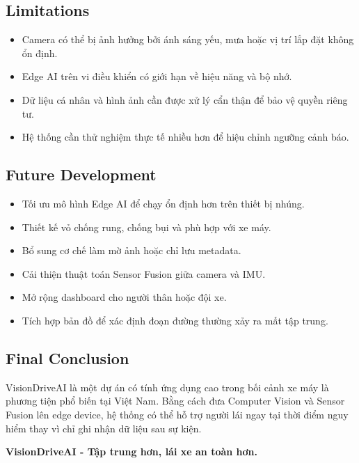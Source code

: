 \documentclass[12pt,a4paper]{article}
\begin{document}
\subsection{Limitations}

\begin{itemize}
    \item Camera có thể bị ảnh hưởng bởi ánh sáng yếu, mưa hoặc vị trí lắp đặt không ổn định.
    \item Edge AI trên vi điều khiển có giới hạn về hiệu năng và bộ nhớ.
    \item Dữ liệu cá nhân và hình ảnh cần được xử lý cẩn thận để bảo vệ quyền riêng tư.
    \item Hệ thống cần thử nghiệm thực tế nhiều hơn để hiệu chỉnh ngưỡng cảnh báo.
\end{itemize}

\subsection{Future Development}

\begin{itemize}
    \item Tối ưu mô hình Edge AI để chạy ổn định hơn trên thiết bị nhúng.
    \item Thiết kế vỏ chống rung, chống bụi và phù hợp với xe máy.
    \item Bổ sung cơ chế làm mờ ảnh hoặc chỉ lưu metadata.
    \item Cải thiện thuật toán Sensor Fusion giữa camera và IMU.
    \item Mở rộng dashboard cho người thân hoặc đội xe.
    \item Tích hợp bản đồ để xác định đoạn đường thường xảy ra mất tập trung.
\end{itemize}

\subsection{Final Conclusion}

VisionDriveAI là một dự án có tính ứng dụng cao trong bối cảnh xe máy là phương tiện phổ biến tại Việt Nam. Bằng cách đưa Computer Vision và Sensor Fusion lên edge device, hệ thống có thể hỗ trợ người lái ngay tại thời điểm nguy hiểm thay vì chỉ ghi nhận dữ liệu sau sự kiện.

\begin{center}
\textbf{VisionDriveAI - Tập trung hơn, lái xe an toàn hơn.}
\end{center}
\end{document}
